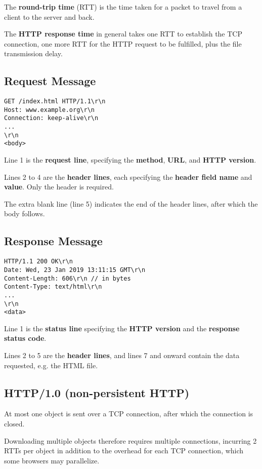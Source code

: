 The \textbf{round-trip time} (RTT) is the time taken for a packet to travel from a client to the server and back.

The \textbf{HTTP response time} in general takes one RTT to establish the TCP connection, one more RTT for the
HTTP request to be fulfilled, plus the file transmission delay.

\subsection{Request Message}
\begin{lstlisting}
GET /index.html HTTP/1.1\r\n
Host: www.example.org\r\n
Connection: keep-alive\r\n
...
\r\n
<body>
\end{lstlisting}

Line 1 is the \textbf{request line}, specifying the \textbf{method}, \textbf{URL}, and \textbf{HTTP version}.

Lines 2 to 4 are the \textbf{header lines}, each specifying the \textbf{header field name} and \textbf{value}.
Only the  header is required.

The extra blank line (line 5) indicates the end of the header lines, after which the body follows.

\subsection{Response Message}
\begin{lstlisting}
HTTP/1.1 200 OK\r\n
Date: Wed, 23 Jan 2019 13:11:15 GMT\r\n
Content-Length: 606\r\n // in bytes
Content-Type: text/html\r\n
...
\r\n
<data>
\end{lstlisting}

Line 1 is the \textbf{status line} specifying the \textbf{HTTP version} and the \textbf{response status code}.

Lines 2 to 5 are the \textbf{header lines}, and lines 7 and onward contain the data requested, e.g. the HTML file.

\subsection{HTTP/1.0 (non-persistent HTTP)}
At most one object is sent over a TCP connection, after which the connection is closed.

Downloading multiple objects therefore requires multiple connections, incurring 2 RTTs per object in addition to the overhead for each TCP
connection, which some browsers may parallelize.

